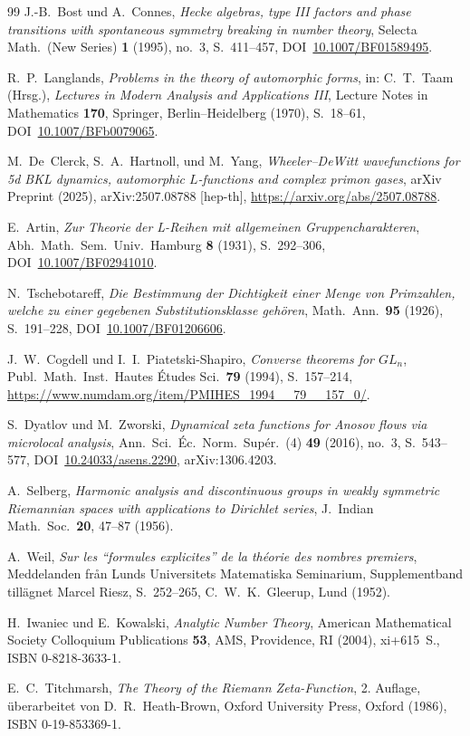 \documentclass[11pt]{article}
\theoremstyle{definition}
\theoremstyle{remark}
\begin{document}
\begin{thebibliography}{99}
J.-B.~Bost und A.~Connes, \emph{Hecke algebras, type III factors
and phase transitions with spontaneous symmetry breaking in number
theory}, Selecta Math.\ (New Series) \textbf{1} (1995), no.~3,
S.~411--457,
DOI~\href{https://doi.org/10.1007/BF01589495}{10.1007/BF01589495}.

R.~P.~Langlands, \emph{Problems in the theory of automorphic
forms}, in: C.~T.~Taam (Hrsg.), \emph{Lectures in Modern Analysis
and Applications III}, Lecture Notes in Mathematics \textbf{170},
Springer, Berlin--Heidelberg (1970), S.~18--61,
DOI~\href{https://doi.org/10.1007/BFb0079065}{10.1007/BFb0079065}.

M.~De~Clerck, S.~A.~Hartnoll, und M.~Yang,
\emph{Wheeler--DeWitt wavefunctions for 5d BKL dynamics, automorphic
$L$-functions and complex primon gases}, arXiv Preprint (2025),
arXiv:2507.08788 [hep-th],
\url{https://arxiv.org/abs/2507.08788}.

E.~Artin, \emph{Zur Theorie der L-Reihen mit allgemeinen
Gruppencharakteren}, Abh.\ Math.\ Sem.\ Univ.\ Hamburg \textbf{8}
(1931), S.~292--306,
DOI~\href{https://doi.org/10.1007/BF02941010}{10.1007/BF02941010}.

N.~Tschebotareff, \emph{Die Bestimmung der Dichtigkeit einer Menge
von Primzahlen, welche zu einer gegebenen Substitutionsklasse
geh\"oren}, Math.\ Ann.\ \textbf{95} (1926), S.~191--228,
DOI~\href{https://doi.org/10.1007/BF01206606}{10.1007/BF01206606}.

J.~W.~Cogdell und I.~I.~Piatetski-Shapiro, \emph{Converse theorems
for $GL_n$}, Publ.\ Math.\ Inst.\ Hautes \'Etudes Sci.\ \textbf{79}
(1994), S.~157--214,
\url{https://www.numdam.org/item/PMIHES_1994__79__157_0/}.

S.~Dyatlov und M.~Zworski, \emph{Dynamical zeta functions for
Anosov flows via microlocal analysis}, Ann.\ Sci.\ \'Ec.\ Norm.\
Sup\'er.\ (4) \textbf{49} (2016), no.~3, S.~543--577,
DOI~\href{https://doi.org/10.24033/asens.2290}{10.24033/asens.2290},
arXiv:1306.4203.

A.~Selberg, \emph{Harmonic analysis and discontinuous groups in
weakly symmetric Riemannian spaces with applications to Dirichlet
series}, J.\ Indian Math.\ Soc.\ \textbf{20}, 47--87 (1956).

A.~Weil, \emph{Sur les ``formules explicites'' de la th\'eorie des
nombres premiers}, Meddelanden fr\aa n Lunds Universitets
Matematiska Seminarium, Supplementband tillägnet Marcel Riesz,
S.~252--265, C.~W.~K.\ Gleerup, Lund (1952).

H.~Iwaniec und E.~Kowalski, \emph{Analytic Number Theory}, American
Mathematical Society Colloquium Publications \textbf{53}, AMS,
Providence, RI (2004), xi+615~S., ISBN 0-8218-3633-1.

E.~C.~Titchmarsh, \emph{The Theory of the Riemann Zeta-Function},
2. Auflage, überarbeitet von D.~R.~Heath-Brown, Oxford University Press,
Oxford (1986), ISBN 0-19-853369-1.

\end{thebibliography}
\end{document}
